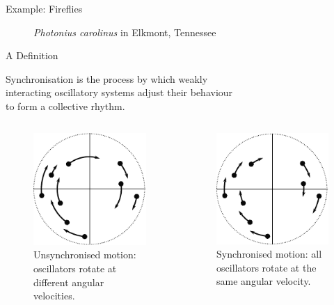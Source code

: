 \documentclass[10pt,reqno]{beamer}
\begin{document}
\begin{frame}{Example: Fireflies\cite{Yiu2017}}

\begin{figure}
	\caption{\emph{Photonius carolinus} in Elkmont, Tennessee}
\end{figure}
\end{frame}
\begin{frame}{A Definition}

\begin{tcolorbox}[notitle, boxrule=0pt, colback=lred]
	\centering
	Synchronisation is the process by which weakly\\ interacting oscillatory systems adjust their behaviour\\ to form a collective rhythm.
\end{tcolorbox}
\begin{columns}
	\scriptsize
	\begin{column}{0.49\textwidth}
		\begin{figure}
			\includegraphics[scale=0.70]{synch1.pdf}
			\caption{Unsynchronised motion: oscillators rotate at different angular velocities.}
		\end{figure}
	\end{column}
	\begin{column}{0.49\textwidth}
		\begin{figure}
			\includegraphics[scale=0.70]{synch2.pdf}
			\caption{Synchronised motion: all oscillators rotate at the same angular velocity.}
		\end{figure}
	\end{column}
\end{columns}
\end{frame}
\end{document}

